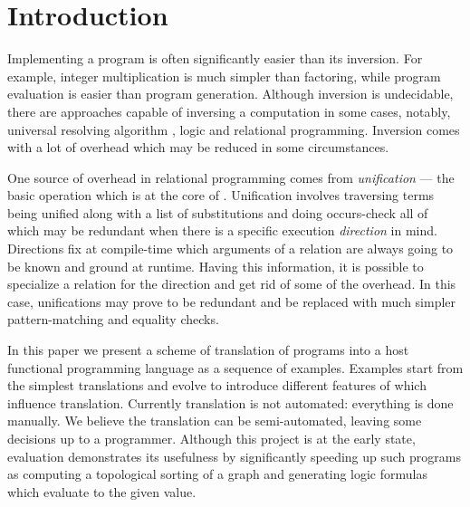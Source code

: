 \section{Introduction}

Implementing a program is often significantly easier than its inversion.
For example, integer multiplication is much simpler than factoring, while program evaluation is easier than program generation.
Although inversion is undecidable, there are approaches capable of inversing a computation in some cases, notably, universal resolving algorithm , logic and relational programming.
Inversion comes with a lot of overhead which may be reduced in some circumstances.

One source of overhead in relational programming comes from \emph{unification} --- the basic operation which is at the core of \mk.
Unification involves traversing terms being unified along with a list of substitutions and doing occurs-check all of which may be redundant when there is a specific execution \emph{direction} in mind.
Directions fix at compile-time which arguments of a relation are always going to be known and ground at runtime.
Having this information, it is possible to specialize a relation for the direction  and get rid of some of the overhead.
In this case, unifications may prove to be redundant and be replaced with much simpler pattern-matching and equality checks.

In this paper we present a scheme of translation of \mk programs into a host functional programming language as a sequence of examples.
Examples start from the simplest translations and evolve to introduce different features of \mk which influence translation.
Currently translation is not automated: everything is done manually.
We believe the translation can be semi-automated, leaving some decisions up to a programmer.
Although this project is at the early state, evaluation demonstrates its usefulness by significantly speeding up such programs as computing a topological sorting of a graph and generating logic formulas which evaluate to the given value.

